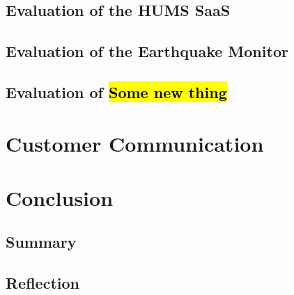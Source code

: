 \documentclass[10pt,a4paper]{article}
\begin{document}
\subsection{Evaluation of the HUMS SaaS}
\label{sec:hums_saas}

\subsection{Evaluation of the Earthquake Monitor}
\label{sec:earthquake}

\subsection{Evaluation of \hl{Some new thing}}
\label{sec:new_thing} %

\section{Customer Communication}
\label{sec:customer_comms}

\section{Conclusion}
\subsection{Summary}
\subsection{Reflection}



\end{document}
